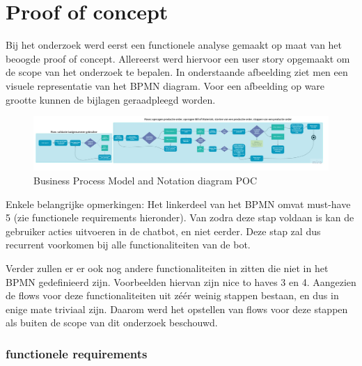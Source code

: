 \section{Proof of concept}
Bij het onderzoek werd eerst een functionele analyse gemaakt op maat van het beoogde proof of concept. Allereerst werd hiervoor een user story opgemaakt om de scope van het onderzoek te bepalen. In onderstaande afbeelding ziet men een visuele representatie van het BPMN diagram. Voor een afbeelding op ware grootte kunnen de bijlagen geraadpleegd worden. 

\begin{figure}[h]
    \centering
    \includegraphics[width=1\textwidth]{img/HappyFlows.jpg}
    \caption{Business Process Model and Notation diagram POC }
\end{figure}

Enkele belangrijke opmerkingen: 
Het linkerdeel van het BPMN omvat must-have 5 (zie functionele requirements hieronder). Van zodra deze stap voldaan is kan de gebruiker acties uitvoeren in de chatbot, en niet eerder. Deze stap zal dus recurrent voorkomen bij alle functionaliteiten van de bot.

Verder zullen er er ook nog andere functionaliteiten in zitten die niet in het BPMN gedefinieerd zijn. Voorbeelden hiervan zijn nice to haves 3 en 4. Aangezien de flows voor deze functionaliteiten uit zéér weinig stappen bestaan, en dus in enige mate triviaal zijn. Daarom werd het opstellen van flows voor deze stappen als buiten de scope van dit onderzoek beschouwd. 

\subsubsection{functionele requirements}

